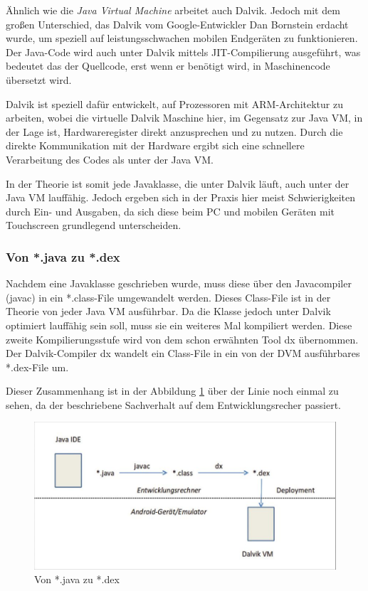 \"Ahnlich wie die \emph{Java Virtual Machine} arbeitet auch Dalvik. Jedoch mit dem gro\ss{}en Unterschied, das Dalvik vom Google-Entwickler Dan Bornstein erdacht wurde, um speziell auf leistungsschwachen mobilen Endger\"aten zu funktionieren. Der Java-Code wird auch unter Dalvik mittels \ac{JIT}-Compilierung ausgef\"uhrt, was bedeutet das der Quellcode, erst wenn er ben\"otigt wird, in Maschinencode \"ubersetzt wird.

Dalvik ist speziell daf\"ur entwickelt, auf Prozessoren mit ARM-Architektur zu arbeiten, wobei die virtuelle Dalvik Maschine hier, im Gegensatz zur Java VM, in der Lage ist, Hardwareregister direkt anzusprechen und zu nutzen. Durch die direkte Kommunikation mit der Hardware ergibt sich eine schnellere Verarbeitung des Codes als unter der Java VM.

In der Theorie ist somit jede Javaklasse, die unter Dalvik l\"auft, auch unter der Java VM lauff\"ahig. Jedoch ergeben sich in der Praxis hier meist Schwierigkeiten durch Ein- und Ausgaben, da sich diese beim PC und mobilen Ger\"aten mit Touchscreen grundlegend unterscheiden.

\subsubsection{Von *.java zu *.dex}
Nachdem eine Javaklasse geschrieben wurde, muss diese \"uber den Javacompiler (javac) in ein *.class-File umgewandelt werden. Dieses Class-File ist in der Theorie von jeder Java VM ausf\"uhrbar. Da die Klasse jedoch unter Dalvik optimiert lauff\"ahig sein soll, muss sie ein weiteres Mal kompiliert werden. Diese zweite Kompilierungsstufe wird von dem schon erw\"ahnten Tool dx \"ubernommen. 
Der Dalvik-Compiler dx wandelt ein Class-File in ein von der \ac{DVM} ausf\"uhrbares *.dex-File um.

Dieser Zusammenhang ist in der Abbildung \ref{JavaZuDex} \"uber der Linie noch einmal zu sehen, da der beschriebene Sachverhalt auf dem Entwicklungsrecher passiert.

\begin{figure}[!ht]
\centering
\includegraphics[width=12cm]{Bilder/JavaZuDex}
\caption{Von *.java zu *.dex \cite{Android44}}
\label{JavaZuDex}
\centering
\end{figure}

